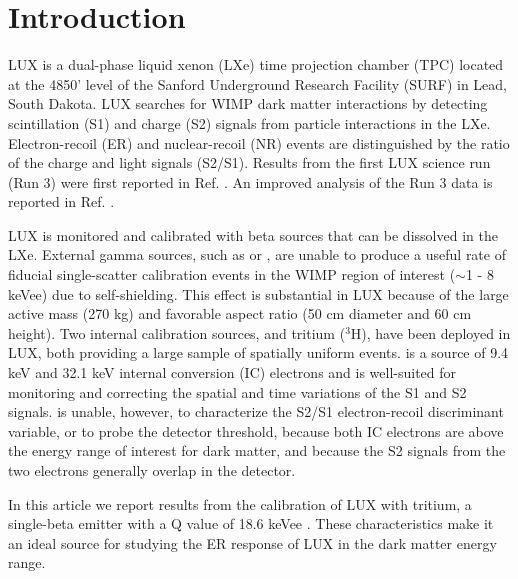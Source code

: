 \section{Introduction}

LUX is a dual-phase liquid xenon (LXe) time projection chamber (TPC) located at the 4850' level of the Sanford Underground Research Facility (SURF) in Lead, South Dakota. LUX searches for WIMP dark matter interactions by detecting scintillation (S1) and charge (S2) signals from particle interactions in the LXe. Electron-recoil (ER) and nuclear-recoil (NR) events are distinguished by the ratio of the charge and light signals (S2/S1). Results from the first LUX science run (Run 3) were first reported in Ref. \cite{LUX_PRL}. An improved analysis of the Run 3 data is reported in Ref. \cite{lux-reanalysis}.


LUX is monitored and calibrated with beta sources that can be dissolved in the LXe. External gamma sources, such as \cssrc or \thsrc, are unable to produce a useful rate of fiducial single-scatter calibration events in the WIMP region of interest ($\sim$1 - 8 keVee) due to self-shielding. This effect is substantial in LUX because of the large active mass (270 kg) and favorable aspect ratio (50 cm diameter and 60 cm height). Two internal calibration sources,  \krsrc\cite{Kastens:2009rt, baudis} and tritium ($^{3}$H), have been deployed in LUX, both providing a large sample of spatially uniform events. \krsrc is a source of 9.4 keV and 32.1 keV internal conversion  (IC) electrons and is well-suited for monitoring and correcting the spatial and time variations of the S1 and S2 signals. \krsrc is unable, however, to characterize the S2/S1 electron-recoil discriminant variable, or to probe the detector threshold, because both IC electrons are above the energy range of interest for dark matter, and because the S2 signals from the two electrons generally overlap in the detector.

In this article we report results from the calibration of LUX with tritium, a single-beta emitter with a Q value of 18.6 keVee \cite{Tritium_Q}.  These characteristics make it an ideal source for studying the ER response of LUX in the dark matter energy range. 

